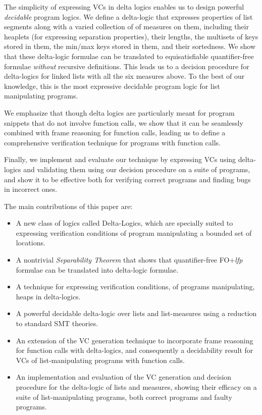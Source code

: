 
The simplicity of expressing VCs in delta logics enables us to design powerful \emph{decidable} program logics.
We define a delta-logic that expresses
properties of list segments along with a varied collection of of measures on them, including their heaplets (for expressing separation properties), 
their lengths, the multisets of keys stored in them, the min/max keys stored in them, and their sortedness. 
We show that these delta-logic formulae can be translated to equisatisfiable quantifier-free formulae \emph{without} recursive definitions. This leads us to a decision procedure for delta-logics for linked lists with all the six measures above. To the best of our knowledge, this is the most expressive decidable program logic for list manipulating programs. 

We emphasize that though delta logics 
are particularly meant for program snippets 
that do not involve function calls, we show that it
can be seamlessly combined with frame reasoning for
function calls, leading us to define a comprehensive verification technique for programs
with function calls.

Finally, we implement and evaluate our technique by expressing VCs using delta-logics and validating them using our decision procedure on a suite of programs, and show it to be effective both for verifying correct
programs and finding bugs in incorrect ones.

\medskip
\noindent
The main contributions of this paper are:
\begin{itemize}
\item A new class of logics called Delta-Logics, which are specially suited to expressing verification conditions of program manipulating a bounded set of locations.

\item A nontrivial \emph{Separability Theorem} that shows that quantifier-free FO+\textit{lfp} formulae can be translated into delta-logic formulae.

\item A technique for expressing verification conditions, of programs manipulating, heaps in delta-logics.

\item A powerful decidable delta-logic over lists and list-measures using a reduction to standard SMT theories.

\item An extension of the VC generation technique to incorporate frame reasoning for function calls with delta-logics, and consequently a decidability result for VCs of list-manipulating programs with function calls.

\item An implementation and evaluation of the VC generation and decision procedure for the delta-logic of lists and measures, showing their efficacy on a suite of list-manipulating programs, both correct programs and faulty programs.
\end{itemize}

